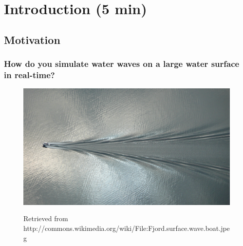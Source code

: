 \section{Introduction (5 min)}

\subsection{Motivation}

\begin{frame}
\frametitle{How do you simulate water waves on a large water surface in real-time?}

\begin{figure}
\centering
\includegraphics[width=\textwidth]{Images/Attribute/Wake/Fjord_surface_wave_boat}

Retrieved from http://commons.wikimedia.org/wiki/File:Fjord.surface.wave.boat.jpeg
\end{figure}
\end{frame}
